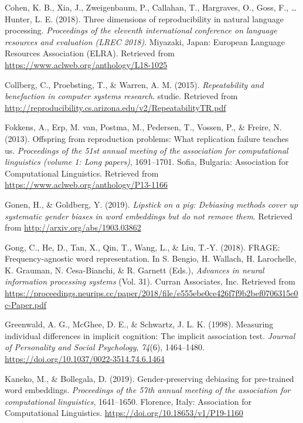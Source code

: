 \documentclass[
  english,
  man,floatsintext]{apa6}
\begin{document}
\leavevmode\hypertarget{ref-cohen_2018}{}%
Cohen, K. B., Xia, J., Zweigenbaum, P., Callahan, T., Hargraves, O., Goss, F., \ldots{} Hunter, L. E. (2018). Three dimensions of reproducibility in natural language processing. \emph{Proceedings of the eleventh international conference on language resources and evaluation (LREC 2018)}. Miyazaki, Japan: European Language Resources Association (ELRA). Retrieved from \url{https://www.aclweb.org/anthology/L18-1025}

\leavevmode\hypertarget{ref-collberg_2015}{}%
Collberg, C., Proebsting, T., \& Warren, A. M. (2015). \emph{Repeatability and benefaction in computer systems research}. studie. Retrieved from \url{http://reproducibility.cs.arizona.edu/v2/RepeatabilityTR.pdf}

\leavevmode\hypertarget{ref-fokkens_2013}{}%
Fokkens, A., Erp, M. van, Postma, M., Pedersen, T., Vossen, P., \& Freire, N. (2013). Offspring from reproduction problems: What replication failure teaches us. \emph{Proceedings of the 51st annual meeting of the association for computational linguistics (volume 1: Long papers)}, 1691--1701. Sofia, Bulgaria: Association for Computational Linguistics. Retrieved from \url{https://www.aclweb.org/anthology/P13-1166}

\leavevmode\hypertarget{ref-gonen_2019}{}%
Gonen, H., \& Goldberg, Y. (2019). \emph{Lipstick on a pig: Debiasing methods cover up systematic gender biases in word embeddings but do not remove them}. Retrieved from \url{http://arxiv.org/abs/1903.03862}

\leavevmode\hypertarget{ref-gong_2018}{}%
Gong, C., He, D., Tan, X., Qin, T., Wang, L., \& Liu, T.-Y. (2018). FRAGE: Frequency-agnostic word representation. In S. Bengio, H. Wallach, H. Larochelle, K. Grauman, N. Cesa-Bianchi, \& R. Garnett (Eds.), \emph{Advances in neural information processing systems} (Vol. 31). Curran Associates, Inc. Retrieved from \url{https://proceedings.neurips.cc/paper/2018/file/e555ebe0ce426f7f9b2bef0706315e0c-Paper.pdf}

\leavevmode\hypertarget{ref-greenwald_1998}{}%
Greenwald, A. G., McGhee, D. E., \& Schwartz, J. L. K. (1998). Measuring individual differences in implicit cognition: The implicit association test. \emph{Journal of Personality and Social Psychology}, \emph{74}(6), 1464--1480. \url{https://doi.org/10.1037/0022-3514.74.6.1464}

\leavevmode\hypertarget{ref-kaneko_2019}{}%
Kaneko, M., \& Bollegala, D. (2019). Gender-preserving debiasing for pre-trained word embeddings. \emph{Proceedings of the 57th annual meeting of the association for computational linguistics}, 1641--1650. Florence, Italy: Association for Computational Linguistics. \url{https://doi.org/10.18653/v1/P19-1160}
\end{document}
